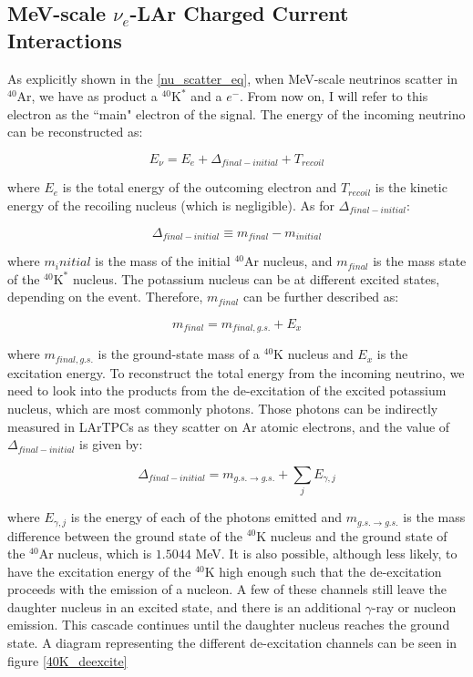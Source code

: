 \subsection{MeV-scale $\nu_e$-LAr Charged Current Interactions}

As explicitly shown in the \ref{nu_scatter_eq}, when MeV-scale neutrinos scatter in $^{40}$Ar, we have as product a $^{40}\textrm{K}^{*}$ and a $e^{-}$. From now on, I will refer to this electron as the ``main" electron of the signal. The energy of the incoming neutrino can be reconstructed as:

\begin{equation}
    E_{\nu} = E_e + \Delta_{final-initial} + T_{recoil} 
    \label{E_mudar_nu}
\end{equation}

where $E_e$ is the total energy of the outcoming electron and $T_{recoil}$ is the kinetic energy of the recoiling nucleus (which is negligible). As for $\Delta_{final-initial}$: 

 \begin{equation}
    \Delta_{final-initial} \equiv m_{final} - m_{initial}  
    \label{delta_fi}
\end{equation}

where $m_initial$ is the mass of the initial $^{40}$Ar nucleus, and $m_{final}$ is the mass state of the $^{40}\textrm{K}^{*}$ nucleus. The potassium nucleus can be at different excited states, depending on the event. Therefore, $m_{final}$ can be further described as:

\begin{equation}
    m_{final} = m_{final, g.s.} + E_x
    \label{mfinal}
\end{equation}

where $m_{final, g.s.}$ is the ground-state mass of a $^40$K nucleus and $E_x$ is the excitation energy. To reconstruct the total energy from the incoming neutrino, we need to look into the products from the de-excitation of the excited potassium nucleus, which are most commonly photons. Those photons can be indirectly measured in LArTPCs as they scatter on Ar atomic electrons, and the value of $\Delta_{final-initial}$ is given by:

\begin{equation}
    \Delta_{final-initial} = m_{g.s. \rightarrow g.s.} + \sum_{j}E_{\gamma, j}   
    \label{delta_fi_2}
\end{equation}

where $E_{\gamma,j}$ is the energy of each of the photons emitted and $m_{g.s. \rightarrow g.s.}$ is the mass difference between the ground state of the $^{40}$K nucleus and the ground state of the $^{40}$Ar nucleus, which is $1.5044$ MeV. 
It is also possible, although less likely, to have the excitation energy of the $^{40}$K high enough such that the de-excitation proceeds with the emission of a nucleon. A few of these channels still leave the daughter nucleus in an excited state, and there is an additional $\gamma$-ray or nucleon emission. This cascade continues until the daughter nucleus reaches the ground state. A diagram representing the different de-excitation channels can be seen in figure \ref{40K_deexcite}

